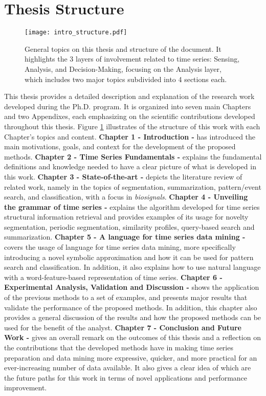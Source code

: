 \section{Thesis Structure}
\label{sec:structure}

\begin{figure}[h]
\centering
\texttt{[image: intro\_structure.pdf]}
\caption{General topics on this thesis and structure of the document. It highlights the 3 layers of involvement related to time series: Sensing, Analysis, and Decision-Making, focusing on the Analysis layer, which includes two major topics subdivided into 4 sections each.}
\label{fig:intro}
\end{figure}

This thesis provides a detailed description and explanation of the research work developed during the Ph.D. program. It is organized into seven main Chapters and two Appendixes, each emphasizing on the scientific contributions developed throughout this thesis. Figure \ref{fig:intro} illustrates of the structure of this work with each Chapter's topics and content. \textbf{Chapter 1 - Introduction -} has introduced the main motivations, goals, and context for the development of the proposed methods. \textbf{Chapter 2 - Time Series Fundamentals -} explains the fundamental definitions and knowledge needed to have a clear picture of what is developed in this work. \textbf{Chapter 3 - State-of-the-art -} depicts the literature review of related work, namely in the topics of segmentation, summarization, pattern/event search, and classification, with a focus in \textit{biosignals}. \textbf{Chapter 4 - Unveiling the grammar of time series -} explains the algorithm developed for time series structural information retrieval and provides examples of its usage for novelty segmentation, periodic segmentation, similarity profiles, query-based search and summarization. \textbf{Chapter 5 - A language for time series data mining -} covers the usage of language for time series data mining, more specifically introducing a novel symbolic approximation and how it can be used for pattern search and classification. In addition, it also explains how to use natural language with a word-feature-based representation of time series. \textbf{Chapter 6 - Experimental Analysis, Validation and Discussion -} shows the application of the previous methods to a set of examples, and presents major results that validate the performance of the proposed methods. In addition, this chapter also provides a general discussion of the results and how the proposed methods can be used for the benefit of the analyst. \textbf{Chapter 7 - Conclusion and Future Work -} gives an overall remark on the outcomes of this thesis and a reflection on the contributions that the developed methods have in making time series preparation and data mining more expressive, quicker, and more practical for an ever-increasing number of data available. It also gives a clear idea of which are the future paths for this work in terms of novel applications and performance improvement.

